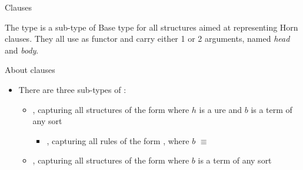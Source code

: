 \documentclass[handout]{beamer}
\begin{document}
\begin{frame}[allowframebreaks]{Clauses}
    \begin{block}{The  type is a sub-type of }\centering
        Base type for all structures aimed at representing Horn clauses.
        They all use  as functor and carry either 1 or 2 arguments, named \emph{head} and \emph{body}.
    \end{block}
    \begin{alertblock}{About clauses}
        \begin{itemize}
            \item There are three sub-types of :
            \begin{itemize}
                \item \alert{}, capturing all structures of the form  where $h$ is a ure and $b$ is a term of any sort
                \begin{itemize}
                    \item \alert{}, capturing all rules of the form , where $b$ $\equiv$ 
                \end{itemize}
                \item \alert{}, capturing all structures of the form  where $b$ is a term of any sort
            \end{itemize}


\end{itemize}
\end{alertblock}
\end{frame}
\end{document}
